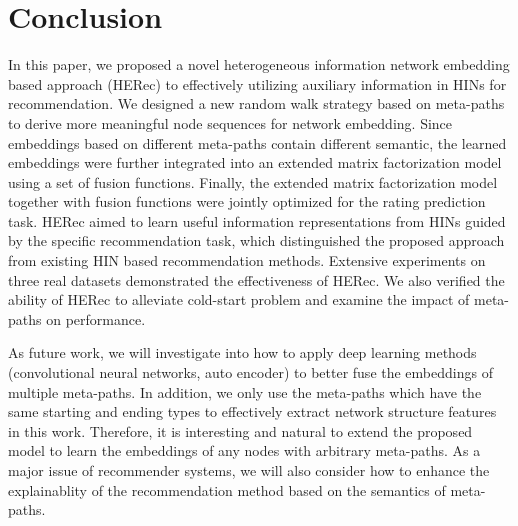 \section{Conclusion \label{sec-con}}
In this paper, we proposed a novel heterogeneous information network embedding based approach (\ie HERec) to effectively utilizing auxiliary information in HINs for recommendation. We designed a new random walk strategy based on meta-paths to derive more meaningful node sequences for network embedding. Since embeddings based on different meta-paths contain different semantic, the learned embeddings were further integrated into an extended matrix factorization model using a set of fusion functions. Finally, the extended matrix factorization model together with fusion functions were jointly optimized for the rating prediction task. HERec aimed to learn useful information representations from HINs guided by the specific recommendation task, which distinguished the proposed approach from existing HIN based recommendation methods. Extensive experiments on three real datasets demonstrated the effectiveness of HERec. We also verified the ability of HERec to alleviate cold-start problem and examine the impact of meta-paths on performance.

As future work, we will investigate into how to apply deep learning methods (\eg convolutional neural networks, auto encoder)
to better fuse the embeddings of multiple meta-paths. In addition, we only use the meta-paths which have the same starting and ending types to effectively extract network structure features in this work. Therefore, it is interesting and natural to extend the proposed model to learn the embeddings of any nodes with arbitrary meta-paths. As a major issue of recommender systems, we will also consider how to enhance the explainablity of the recommendation method based on the semantics of meta-paths.
